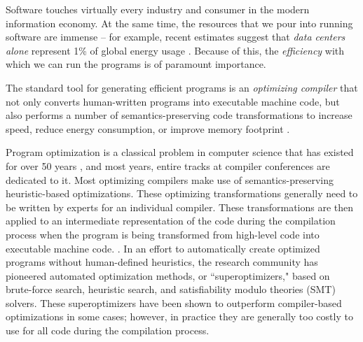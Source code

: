 \documentclass{article}
\begin{document}

Software touches virtually every industry and consumer in the modern information economy.
At the same time, the resources that we pour into running software are immense -- for example, recent estimates suggest that \emph{data centers alone} represent 1\% of global energy usage \citep{masanet2020recalibrating}.
Because of this, the \emph{efficiency} with which we can run the programs is of paramount importance.

The standard tool for generating efficient programs is an \emph{optimizing compiler} that not only converts human-written programs into executable machine code, but also performs a number of semantics-preserving code transformations to increase speed, reduce energy consumption, or improve memory footprint \citep{dragonbook}.

Program optimization is a classical problem in computer science that has existed for over 50 years \cite{mckeeman1965peephole, allen1971}, and most years, entire tracks at compiler conferences are dedicated to it. Most optimizing compilers make use of semantics-preserving heuristic-based optimizations. These optimizing transformations generally need to be written by experts for an individual compiler. These transformations are then applied to an intermediate representation of the code during the compilation process when the program is being transformed from high-level code into executable machine code.   .  In an effort to automatically create optimized programs without human-defined heuristics, the research community has pioneered automated optimization methods, or ``superoptimizers," based on brute-force search, heuristic search, and satisfiability modulo theories (SMT) solvers. These superoptimizers have been shown to outperform compiler-based optimizations in some cases; however, in practice they are generally too costly to use for all code during the compilation process. 
\end{document}
